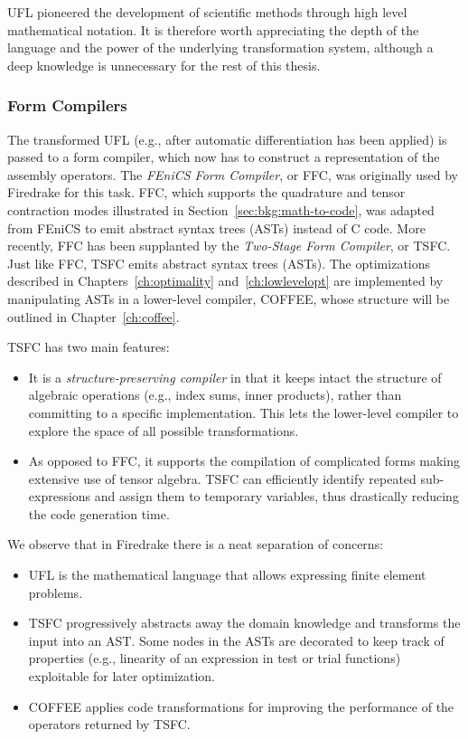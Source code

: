 UFL pioneered the development of scientific methods through high level mathematical notation. It is therefore worth appreciating the depth of the language and the power of the underlying transformation system, although a deep knowledge is unnecessary for the rest of this thesis.


\subsubsection{Form Compilers}
The transformed UFL (e.g., after automatic differentiation has been applied) is passed to a form compiler, which now has to construct a representation of the assembly operators. The {\em FEniCS Form Compiler}, or FFC, was originally used by Firedrake for this task. FFC, which supports the quadrature and tensor contraction modes illustrated in Section~\ref{sec:bkg:math-to-code}, was adapted from FEniCS to emit abstract syntax trees (ASTs) instead of C code. More recently, FFC has been supplanted by the {\em Two-Stage Form Compiler}, or TSFC. Just like FFC, TSFC emits abstract syntax trees (ASTs). The optimizations described in Chapters~\ref{ch:optimality} and~\ref{ch:lowlevelopt} are implemented by manipulating ASTs in a lower-level compiler, COFFEE, whose structure will be outlined in Chapter~\ref{ch:coffee}.

TSFC has two main features:
\begin{itemize}
\item It is a \textit{structure-preserving compiler} in that it keeps intact the structure of algebraic operations (e.g., index sums, inner products), rather than committing to a specific implementation. This lets the lower-level compiler to explore the space of all possible transformations.
\item As opposed to FFC, it supports the compilation of complicated forms making extensive use of tensor algebra. TSFC can efficiently identify repeated sub-expressions and assign them to temporary variables, thus drastically reducing the code generation time.
\end{itemize}

We observe that in Firedrake there is a neat separation of concerns:
\begin{itemize}
\item UFL is the mathematical language that allows expressing finite element problems.
\item TSFC progressively abstracts away the domain knowledge and transforms the input into an AST. Some nodes in the ASTs are decorated to keep track of properties (e.g., linearity of an expression in test or trial functions) exploitable for later optimization.
\item COFFEE applies code transformations for improving the performance of the operators returned by TSFC. 
\end{itemize}

